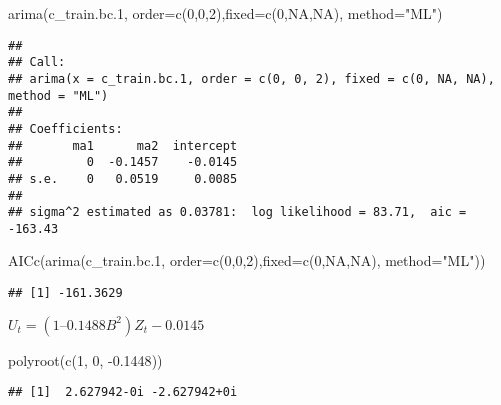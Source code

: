 \documentclass[
]{article}
\newenvironment{Shaded}{\begin{snugshade}}{\end{snugshade}}
\newcommand{\AttributeTok}[1]{\textcolor[rgb]{0.77,0.63,0.00}{#1}}
\newcommand{\ConstantTok}[1]{\textcolor[rgb]{0.00,0.00,0.00}{#1}}
\newcommand{\DecValTok}[1]{\textcolor[rgb]{0.00,0.00,0.81}{#1}}
\newcommand{\FloatTok}[1]{\textcolor[rgb]{0.00,0.00,0.81}{#1}}
\newcommand{\FunctionTok}[1]{\textcolor[rgb]{0.00,0.00,0.00}{#1}}
\newcommand{\NormalTok}[1]{#1}
\newcommand{\SpecialCharTok}[1]{\textcolor[rgb]{0.00,0.00,0.00}{#1}}
\newcommand{\StringTok}[1]{\textcolor[rgb]{0.31,0.60,0.02}{#1}}
\begin{document}
\begin{Shaded}
\begin{Highlighting}[]
\FunctionTok{arima}\NormalTok{(c\_train.bc}\FloatTok{.1}\NormalTok{, }\AttributeTok{order=}\FunctionTok{c}\NormalTok{(}\DecValTok{0}\NormalTok{,}\DecValTok{0}\NormalTok{,}\DecValTok{2}\NormalTok{),}\AttributeTok{fixed=}\FunctionTok{c}\NormalTok{(}\DecValTok{0}\NormalTok{,}\ConstantTok{NA}\NormalTok{,}\ConstantTok{NA}\NormalTok{), }\AttributeTok{method=}\StringTok{"ML"}\NormalTok{)}
\end{Highlighting}
\end{Shaded}

\begin{verbatim}
## 
## Call:
## arima(x = c_train.bc.1, order = c(0, 0, 2), fixed = c(0, NA, NA), method = "ML")
## 
## Coefficients:
##       ma1      ma2  intercept
##         0  -0.1457    -0.0145
## s.e.    0   0.0519     0.0085
## 
## sigma^2 estimated as 0.03781:  log likelihood = 83.71,  aic = -163.43
\end{verbatim}

\begin{Shaded}
\begin{Highlighting}[]
\FunctionTok{AICc}\NormalTok{(}\FunctionTok{arima}\NormalTok{(c\_train.bc}\FloatTok{.1}\NormalTok{, }\AttributeTok{order=}\FunctionTok{c}\NormalTok{(}\DecValTok{0}\NormalTok{,}\DecValTok{0}\NormalTok{,}\DecValTok{2}\NormalTok{),}\AttributeTok{fixed=}\FunctionTok{c}\NormalTok{(}\DecValTok{0}\NormalTok{,}\ConstantTok{NA}\NormalTok{,}\ConstantTok{NA}\NormalTok{), }\AttributeTok{method=}\StringTok{"ML"}\NormalTok{))}
\end{Highlighting}
\end{Shaded}

\begin{verbatim}
## [1] -161.3629
\end{verbatim}

\(U_t = (1 – 0.1488B^2)Z_t -0.0145\)

\begin{Shaded}
\begin{Highlighting}[]
\FunctionTok{polyroot}\NormalTok{(}\FunctionTok{c}\NormalTok{(}\DecValTok{1}\NormalTok{, }\DecValTok{0}\NormalTok{, }\SpecialCharTok{{-}}\FloatTok{0.1448}\NormalTok{))}
\end{Highlighting}
\end{Shaded}

\begin{verbatim}
## [1]  2.627942-0i -2.627942+0i
\end{verbatim}
\end{document}
